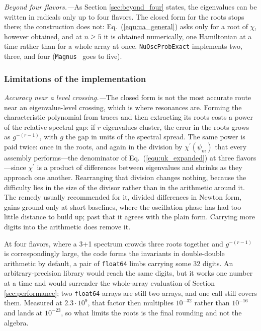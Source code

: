 \documentclass[final,5p,times,twocolumn,sort,compress]{elsarticle}
\newcommand{\eq}{Eq.}
\newcommand{\equ}[1]{\eq~(\ref{equ:#1})}
\begin{document}
\smallskip

\textit{Beyond four flavors.---}As Section \ref{sec:beyond_four} states, the eigenvalues can be written in radicals only up to four flavors.  The closed form for the roots stops there; the construction does not: \equ{ua_general} asks only for a root of $\chi$, however obtained, and at $n \geq 5$ it is obtained numerically, one Hamiltonian at a time rather than for a whole array at once.  {\tt NuOscProbExact} implements two, three, and four ({\tt Magnus}\ \cite{Magnus} goes to five).


\subsubsection{Limitations of the implementation}

\textit{Accuracy near a level crossing.---}The closed form is not the most accurate route near an eigenvalue-level crossing, which is where resonances are.  Forming the characteristic polynomial from traces and then extracting its roots costs a power of the relative spectral gap: if $r$ eigenvalues cluster, the error in the roots grows as $g^{-(r-1)}$, with $g$ the gap in units of the spectral spread.  The same power is paid twice: once in the roots, and again in the division by $\chi^\prime(\psi_m)$ that every assembly performs---the denominator of \equ{uk_expanded} at three flavors---since $\chi^\prime$ is a product of differences between eigenvalues and shrinks as they approach one another.  Rearranging that division changes nothing, because the difficulty lies in the size of the divisor rather than in the arithmetic around it.  The remedy usually recommended for it, divided differences in Newton form, gains ground only at short baselines, where the oscillation phase has had too little distance to build up; past that it agrees with the plain form.  Carrying more digits into the arithmetic does remove it.

At four flavors, where a 3+1 spectrum crowds three roots together and $g^{-(r-1)}$ is correspondingly large, the code forms the invariants in double-double arithmetic by default, a pair of {\tt float64} limbs carrying some $32$ digits.  An arbitrary-precision library would reach the same digits, but it works one number at a time and would surrender the whole-array evaluation of Section \ref{sec:performance}; two {\tt float64} arrays are still two arrays, and one call still covers them.  Measured at $2.3 \cdot 10^9$, that factor then multiplies $10^{-32}$ rather than $10^{-16}$ and lands at $10^{-23}$, so what limits the roots is the final rounding and not the algebra.
\end{document}
